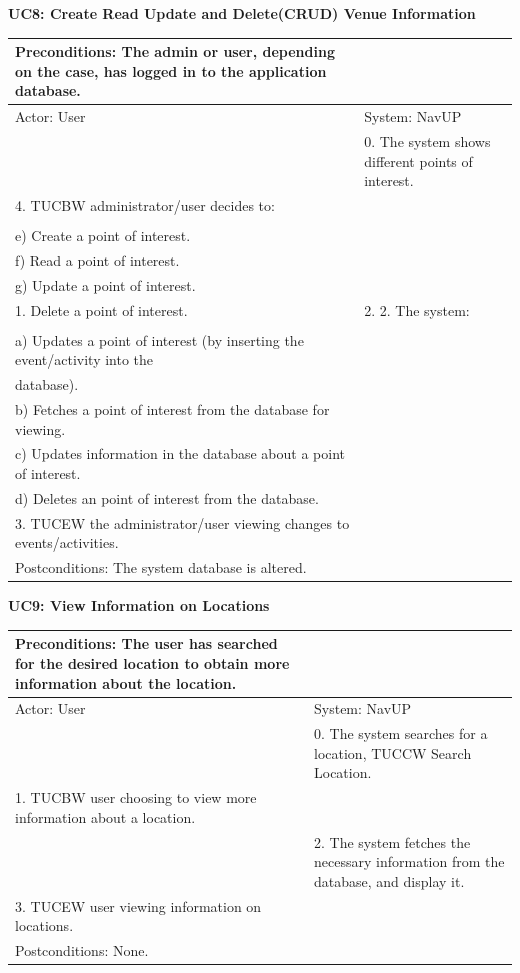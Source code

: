 \documentclass{article}
\begin{document}
				
        		\centering
					\textbf{UC8: Create Read Update and Delete(CRUD) Venue Information}\\
       		 \small
       		 \begin{tabular}{|p{8cm}|p{8cm}|}
       		 \hline
       		 Preconditions: The admin or user, depending on the case, has logged in to the application database.& \\
       		 \hline
       		 Actor: User & System: NavUP \\
        		\hline
       		 & 0.	The system shows different points of interest.\\
       		 \hline
       		4.	TUCBW administrator/user decides to:\\

\\e)	Create a point of interest.
\\f)	Read a point of interest.
\\g)	Update a point of interest.
\\1.	Delete a point of interest.

 				&2.	2.	The system:\\

\\a)	Updates a point of interest (by inserting the event/activity into the \\database).
\\b)	Fetches a point of interest from the database for viewing.
\\c)	Updates information in the database about a point of interest.
\\d)	Deletes an point of interest from the database.
\\
        		\hline
       		 	3.	TUCEW the administrator/user viewing changes to events/activities. &\\
       		 \hline
        		Postconditions: The system database is altered. \\
        		\hline
        \end{tabular} 
       
		
        		\centering
					\textbf{UC9: View Information on Locations}\\
       		 \small
       		 \begin{tabular}{|p{8cm}|p{8cm}|}
       		 \hline
       		 Preconditions: The user has searched for the desired location to obtain more information about the location.& \\
       		 \hline
       		 Actor: User & System: NavUP \\
        		\hline
       		& 0.	The system searches for a location, TUCCW Search Location.\\
       		 \hline
       		 1.	TUCBW user choosing to view more information about a location.\\  & 2.	The system fetches the necessary information from the database, and display it.\\
        		\hline
       		 3.	TUCEW user viewing information on locations. &\\
       		 \hline
        		Postconditions: None. & \\
        		\hline
        \end{tabular} 
      
\end{document}
